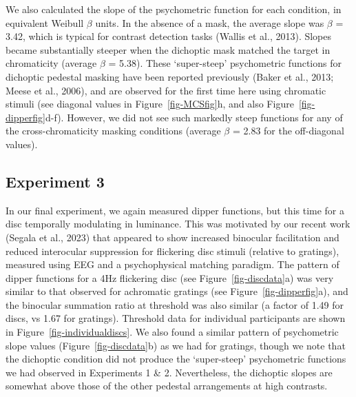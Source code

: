 \documentclass[
  letterpaper,
  DIV=11,
  numbers=noendperiod]{scrartcl}
\begin{document}
We also calculated the slope of the psychometric function for each
condition, in equivalent Weibull \(\beta\) units. In the absence of a
mask, the average slope was \(\beta\) = 3.42, which is typical for
contrast detection tasks (Wallis et al., 2013). Slopes became
substantially steeper when the dichoptic mask matched the target in
chromaticity (average \(\beta\) = 5.38). These `super-steep'
psychometric functions for dichoptic pedestal masking have been reported
previously (Baker et al., 2013; Meese et al., 2006), and are observed
for the first time here using chromatic stimuli (see diagonal values in
Figure~\ref{fig-MCSfig}h, and also Figure~\ref{fig-dipperfig}d-f).
However, we did not see such markedly steep functions for any of the
cross-chromaticity masking conditions (average \(\beta\) = 2.83 for the
off-diagonal values).

\subsection{Experiment 3}\label{experiment-3}

In our final experiment, we again measured dipper functions, but this
time for a disc temporally modulating in luminance. This was motivated
by our recent work (Segala et al., 2023) that appeared to show increased
binocular facilitation and reduced interocular suppression for
flickering disc stimuli (relative to gratings), measured using EEG and a
psychophysical matching paradigm. The pattern of dipper functions for a
4Hz flickering disc (see Figure~\ref{fig-discdata}a) was very similar to
that observed for achromatic gratings (see Figure~\ref{fig-dipperfig}a),
and the binocular summation ratio at threshold was also similar (a
factor of 1.49 for discs, vs 1.67 for gratings). Threshold data for
individual participants are shown in Figure~\ref{fig-individualdiscs}.
We also found a similar pattern of psychometric slope values
(Figure~\ref{fig-discdata}b) as we had for gratings, though we note that
the dichoptic condition did not produce the `super-steep' psychometric
functions we had observed in Experiments 1 \& 2. Nevertheless, the
dichoptic slopes are somewhat above those of the other pedestal
arrangements at high contrasts.
\end{document}
